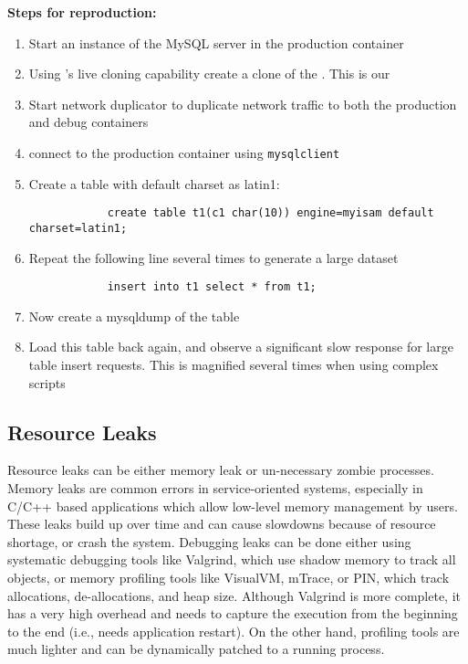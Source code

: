 \noindent \textbf{Steps for reproduction:} \\

\begin{adjustwidth}{0.5cm}{}
	\begin{enumerate}
		\item Start an instance of the MySQL server in the production container
		\item Using \parikshan's live cloning capability create a clone of the \productioncontainer. This is our \debugcontainer
		\item Start network duplicator to duplicate network traffic to both the production and debug containers
		\item connect to the production container using \texttt{mysqlclient}
		\item Create a table with default charset as latin1:
			
			\begin{lstlisting}
			create table t1(c1 char(10)) engine=myisam default charset=latin1;
			\end{lstlisting}
			
		\item Repeat the following line several times to generate a large dataset
		
			\begin{lstlisting}
			insert into t1 select * from t1;
			\end{lstlisting}
	
		\item Now create a mysqldump of the table
		\item Load this table back again, and observe a significant slow response for large table insert requests. This is magnified several times when using complex scripts
	\end{enumerate}
\end{adjustwidth}	



\subsection{Resource Leaks}
Resource leaks can be either memory leak or un-necessary zombie processes.
Memory leaks are common errors in service-oriented systems, especially in C/C++ based applications which allow low-level memory management by users.
These leaks build up over time and can cause slowdowns because of resource shortage, or crash the system.
Debugging leaks can be done either using systematic debugging tools like Valgrind, which use shadow memory to track all objects, or memory profiling tools like VisualVM, mTrace, or PIN, which track allocations, de-allocations, and heap size.
Although Valgrind is more complete, it has a very high overhead and needs to capture the execution from the beginning to the end (i.e., needs application restart).
On the other hand, profiling tools are much lighter and can be dynamically patched to a running process.



